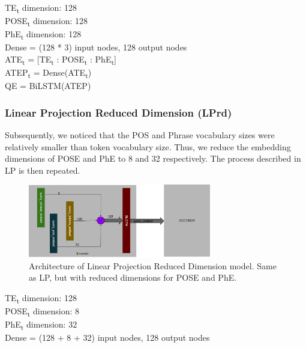 \documentclass{IEEEtran}
\begin{document}
        \hspace*{-3.5mm}TE\textsubscript{t} dimension: 128 \\
        POSE\textsubscript{t} dimension: 128 \\
        PhE\textsubscript{t} dimension: 128 \\
        Dense = (128 * 3) input nodes, 128 output nodes \\ 

        \hspace*{-3.5mm}ATE\textsubscript{t} = [TE\textsubscript{t} : 
        POSE\textsubscript{t} : PhE\textsubscript{t}] \\
        ATEP\textsubscript{t} = Dense(ATE\textsubscript{t}) \\
        QE = BiLSTM(ATEP) \\

        \subsubsection{Linear Projection Reduced Dimension (LPrd)} 
        Subsequently, we noticed that the POS and Phrase vocabulary sizes were relatively smaller
        than token vocabulary size. Thus, we reduce the embedding dimensions
        of POSE and PhE to 8 and 32 respectively. The process described in LP is then repeated. \\

        \begin{figure}[h]
          \centering
          \includegraphics[width=8cm]{lprd.png}
          \caption{Architecture of Linear Projection Reduced Dimension model. Same as LP, but with
          reduced dimensions for POSE and PhE.}
          \label{fig:lprd}
        \end{figure}

        \hspace*{-3.5mm}TE\textsubscript{t} dimension: 128 \\
        POSE\textsubscript{t} dimension: 8 \\
        PhE\textsubscript{t} dimension: 32 \\
        Dense = (128 + 8 + 32) input nodes, 128 output nodes \\ 
\end{document}
